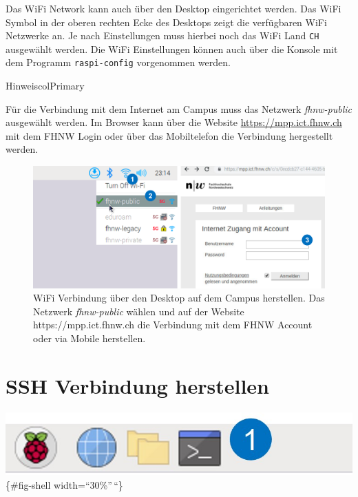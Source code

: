 \documentclass[
  11pt,
  a4paperpaper,
  oneside, openany  ,captions=tableheading
]{scrbook}
\theoremstyle{definition}
\theoremstyle{remark}
\begin{document}
Das WiFi Network kann auch über den Desktop eingerichtet werden. Das
WiFi Symbol in der oberen rechten Ecke des Desktops zeigt die
verfügbaren WiFi Netzwerke an. Je nach Einstellungen muss hierbei noch
das WiFi Land \texttt{CH} ausgewählt werden. Die WiFi Einstellungen
können auch über die Konsole mit dem Programm \texttt{raspi-config}
vorgenommen werden.

\begin{boxtitle}{Hinweis}{colPrimary}

Für die Verbindung mit dem Internet am Campus muss das Netzwerk
\emph{fhnw-public} ausgewählt werden. Im Browser kann über die Website
\url{https://mpp.ict.fhnw.ch} mit dem FHNW Login oder über das
Mobiltelefon die Verbindung hergestellt werden.

\end{boxtitle}

\begin{figure}[H]

{\centering \includegraphics{images/raspberry_pi_image_wifi_cmu.png}

}

\caption{WiFi Verbindung über den Desktop auf dem Campus herstellen. Das
Netzwerk \emph{fhnw-public} wählen und auf der Website
https://mpp.ict.fhnw.ch die Verbindung mit dem FHNW Account oder via
Mobile herstellen.}

\end{figure}%

\section{\texorpdfstring{SSH Verbindung
herstellen}{SSH Verbindung herstellen}}\label{ssh-verbindung-herstellen}

\includegraphics{images/raspberry_pi_shell.jpg}\{\#fig-shell
width=``30\%''\,``\}
\end{document}
